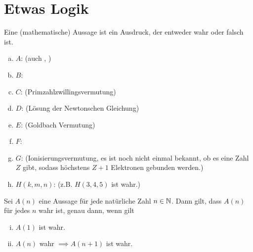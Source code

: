 \documentclass[../ana1.tex]{subfiles}
\begin{document}
\section{Etwas Logik}
\begin{defi*}
	Eine (mathematische) Aussage ist ein Ausdruck, der entweder wahr oder falsch ist.
\end{defi*}

\begin{bspe}\leavevmode
	\begin{enumerate}[(a)]
		\item \(A\):   (auch , )
		\item \(B\): 
		\item \(C\):  (Primzahlzwillingsvermutung)
		\item \(D\):  (Lösung der Newtonschen Gleichung)
		\item \(E\):  (Goldbach Vermutung)
		\item \(F\): 
		\item \(G\):  (Ionisierungsvermutung, es ist noch nicht einmal bekannt, ob es eine Zahl \(Z\) gibt, sodass höchstens \(Z+1\) Elektronen gebunden werden.)
		\item \(H(k,m,n)\):  (z.B. \(H(3,4,5)\) ist wahr.)
	\end{enumerate}
\end{bspe}

\begin{bem}
	Sei  \(A(n)\) eine Aussage für jede natürliche Zahl \(n\in \mathbb{N}\). Dann gilt, dass
	\(A(n)\) für jedes \(n\) wahr ist, genau dann, wenn gilt
	\begin{enumerate}[(i)]
		\item \(A(1)\) ist wahr.
		\item \(A(n)\) wahr \(\implies A(n+1)\) ist wahr.
	\end{enumerate}
\end{bem}
\end{document}
